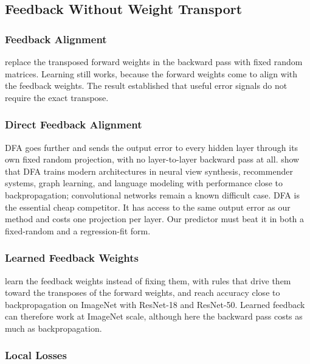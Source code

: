 \documentclass{article}
\begin{document}
\subsection{Feedback Without Weight Transport}

\subsubsection{Feedback Alignment}

\textcite{lillicrap2016random} replace the transposed forward weights in the
backward pass with fixed random matrices. Learning still works, because the
forward weights come to align with the feedback weights. The result established
that useful error signals do not require the exact transpose.

\subsubsection{Direct Feedback Alignment}

DFA \parencite{nokland2016dfa} goes further and sends the output error to every
hidden layer through its own fixed random projection, with no layer-to-layer
backward pass at all. \textcite{launay2020dfa} show that DFA trains modern
architectures in neural view synthesis, recommender systems, graph learning,
and language modeling with performance close to backpropagation; convolutional
networks remain a known difficult case. DFA is the essential cheap competitor.
It has access to the same output error as our method and costs one projection
per layer. Our predictor must beat it in both a fixed-random and a
regression-fit form.

\subsubsection{Learned Feedback Weights}

\textcite{akrout2019weighttransport} learn the feedback weights instead of
fixing them, with rules that drive them toward the transposes of the forward
weights, and reach accuracy close to backpropagation on ImageNet with ResNet-18
and ResNet-50. Learned feedback can therefore work at ImageNet scale, although
here the backward pass costs as much as backpropagation.

\subsubsection{Local Losses}
\end{document}
